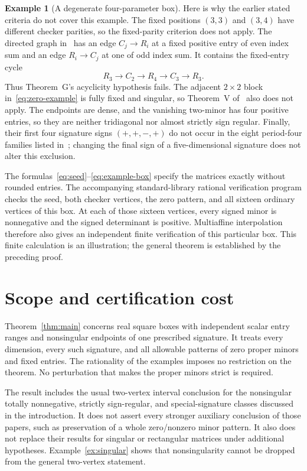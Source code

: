 \documentclass[11pt]{article}
\theoremstyle{definition}
\newtheorem{example}[theorem]{Example}
\theoremstyle{remark}
\numberwithin{equation}{section}
\begin{document}
\begin{example}[A degenerate four-parameter box]
Here is why the earlier stated criteria do not cover this example.
The fixed positions $(3,3)$ and $(3,4)$ have different checker
parities, so the fixed-parity criterion does not apply.
The directed graph in~\cite{HoldenGraph2026} has an edge
$C_j\to R_i$ at a fixed positive entry of even index sum and
an edge $R_i\to C_j$ at one of odd index sum. It contains the
fixed-entry cycle
\[
 R_3\longrightarrow C_2\longrightarrow R_4
      \longrightarrow C_3\longrightarrow R_3.
\]
Thus Theorem~G's acyclicity hypothesis fails. The adjacent
$2\times2$ block in~\eqref{eq:zero-example} is fully fixed
and singular, so Theorem~V of~\cite{HoldenFive2026} also does
not apply. The endpoints are dense, and the vanishing two-minor
has four positive entries, so they are neither tridiagonal nor
almost strictly sign regular. Finally, their first four
signature signs $(+,+,-,+)$ do not occur in the eight
period-four families listed in~\cite{HassunehAdmGarloff2025};
changing the final sign of a five-dimensional signature does
not alter this exclusion.

The formulas~\eqref{eq:seed}--\eqref{eq:example-box} specify
the matrices exactly without rounded entries. The accompanying
standard-library rational verification program checks the seed,
both checker vertices, the zero pattern, and all sixteen
ordinary vertices of this box. At each of those sixteen
vertices, every signed minor is nonnegative and the signed
determinant is positive. Multiaffine interpolation therefore
also gives an independent finite verification of this
particular box. This finite calculation is an illustration;
the general theorem is established by the preceding proof.
\end{example}

\section{Scope and certification cost}\label{sec:scope}

Theorem~\ref{thm:main} concerns real square boxes with independent
scalar entry ranges and nonsingular endpoints of one prescribed
signature. It treats every dimension, every such signature, and
all allowable patterns of zero proper minors and fixed entries.
The rationality of the examples imposes no restriction on the
theorem. No perturbation that makes the proper minors strict
is required.

The result includes the usual two-vertex interval conclusion
for the nonsingular totally nonnegative, strictly sign-regular,
and special-signature classes discussed in the introduction.
It does not assert every stronger auxiliary conclusion of
those papers, such as preservation of a whole zero/nonzero
minor pattern. It also does not replace their results for
singular or rectangular matrices under additional hypotheses.
Example~\ref{ex:singular} shows that nonsingularity cannot be
dropped from the general two-vertex statement.
\end{document}
